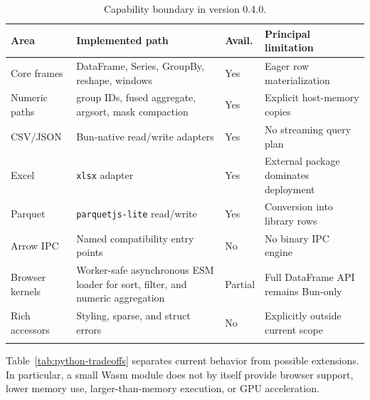 \documentclass[pdflatex,sn-basic,Numbered]{sn-jnl}
\begin{document}
\begin{table}[t]
\caption{Capability boundary in version 0.4.0.}\label{tab:capabilities}
\begin{tabularx}{\textwidth}{@{}p{21mm}Xp{12mm}p{31mm}@{}}
\toprule
Area & Implemented path & Avail. & Principal limitation \\
\midrule
Core frames & DataFrame, Series, GroupBy, reshape, windows & Yes & Eager row materialization \\
Numeric paths & group IDs, fused aggregate, argsort, mask compaction & Yes & Explicit host-memory copies \\
CSV/JSON & Bun-native read/write adapters & Yes & No streaming query plan \\
Excel & \texttt{xlsx} adapter & Yes & External package dominates deployment \\
Parquet & \texttt{parquetjs-lite} read/write & Yes & Conversion into library rows \\
Arrow IPC & Named compatibility entry points & No & No binary IPC engine \\
Browser kernels & Worker-safe asynchronous ESM loader for sort, filter, and numeric aggregation & Partial & Full DataFrame API remains Bun-only \\
Rich accessors & Styling, sparse, and struct errors & No & Explicitly outside current scope \\
\botrule
\end{tabularx}
\end{table}

Table~\ref{tab:python-tradeoffs} separates current behavior from possible extensions. In particular, a small Wasm module does not by itself provide browser support, lower memory use, larger-than-memory execution, or GPU acceleration.
\end{document}
